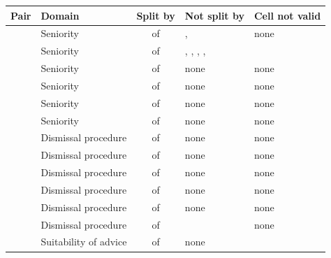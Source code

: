 \begin{table}[t]
\centering
\footnotesize
\begin{tabular}{llcP{0.4\textwidth}P{0.2\textwidth}}
\toprule
Pair & Domain & Split by & Not split by & Cell not valid \\
\midrule
{} & Seniority & \JudgementConsensusSplitKOne{} of \JudgementConsensusValidKOne{} & ,  & none \\
 & Seniority & \JudgementConsensusSplitKTwo{} of \JudgementConsensusValidKTwo{} & , , , ,  &  \\
 & Seniority & \JudgementConsensusSplitKThree{} of \JudgementConsensusValidKThree{} & none & none \\
 & Seniority & \JudgementConsensusSplitKFour{} of \JudgementConsensusValidKFour{} & none & none \\
 & Seniority & \JudgementConsensusSplitKFive{} of \JudgementConsensusValidKFive{} & none & none \\
 & Seniority & \JudgementConsensusSplitKSix{} of \JudgementConsensusValidKSix{} & none & none \\
 & Dismissal procedure & \JudgementConsensusSplitDOne{} of \JudgementConsensusValidDOne{} & none & none \\
 & Dismissal procedure & \JudgementConsensusSplitDTwo{} of \JudgementConsensusValidDTwo{} & none & none \\
 & Dismissal procedure & \JudgementConsensusSplitDThree{} of \JudgementConsensusValidDThree{} & none & none \\
 & Dismissal procedure & \JudgementConsensusSplitDFour{} of \JudgementConsensusValidDFour{} & none & none \\
 & Dismissal procedure & \JudgementConsensusSplitDFive{} of \JudgementConsensusValidDFive{} & none & none \\
 & Dismissal procedure & \JudgementConsensusSplitDSix{} of \JudgementConsensusValidDSix{} &  & none \\
 & Suitability of advice & \JudgementConsensusSplitSOne{} of \JudgementConsensusValidSOne{} & none &  \\

\end{tabular}
\end{table}
